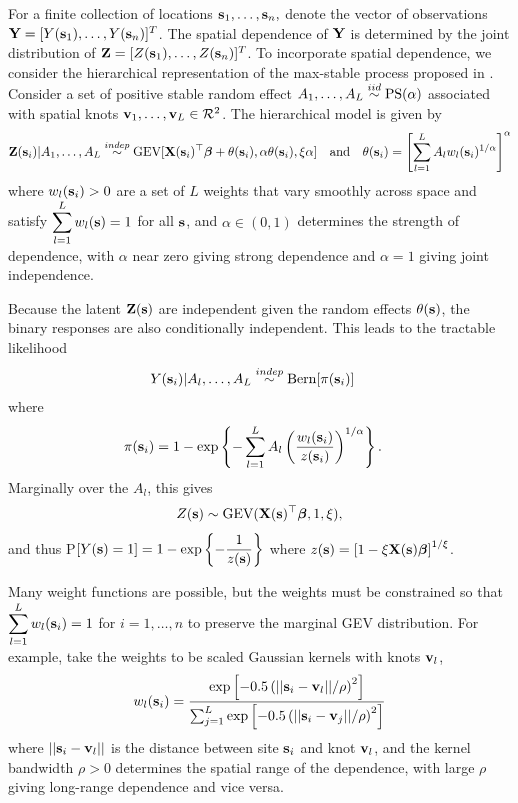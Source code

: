 \documentclass[11pt]{article}
\begin{document}
For a finite collection of locations $\mbox{\bf s}_1, \ldots, \mbox{\bf s}_n,$ denote the vector of observations $\mbox{\bf Y} = [Y(\mbox{\bf s}_1), \ldots, Y(\mbox{\bf s}_n)]^T$.
The spatial dependence of $\mbox{\bf Y}$ is determined by the joint distribution of $\mbox{\bf Z} = [Z(\mbox{\bf s}_1),\ldots, Z(\mbox{\bf s}_n)]^T$.
To incorporate spatial dependence, we consider the hierarchical representation of the max-stable process proposed in \citet{Reich2012}.
Consider a set of positive stable random effect $A_1, \ldots, A_L \stackrel{iid}{\sim} \text{PS}(\alpha)$ associated with spatial knots $\mbox{\bf v}_1, \ldots, \mbox{\bf v}_L \in {\cal R}^2$.
The hierarchical model is given by
\begin{align} \label{rbeq:hiermodel}
  \mbox{\bf Z}(\mbox{\bf s}_i) | A_1, \ldots, A_L \stackrel{indep}{\sim} \text{GEV}[\mbox{\bf X}(\mbox{\bf s}_i)^\top \mbox{\boldmath $\beta$} + \theta(\mbox{\bf s}_i), \alpha \theta(\mbox{\bf s}_i), \xi \alpha] \quad \text{and} \quad \theta(\mbox{\bf s}_i) = \left[\sum_{l = 1}^L A_l w_l (\mbox{\bf s}_i)^{1 / \alpha} \right]^\alpha
\end{align}
where $w_{l}(\mbox{\bf s}_i) > 0$ are a set of $L$ weights that vary smoothly across space and satisfy $\displaystyle \sum_{l = 1}^L w_l(\mbox{\bf s}) = 1$ for all $\mbox{\bf s}$, and $\alpha\in(0,1)$ determines the strength of dependence, with $\alpha$ near zero giving strong dependence and $\alpha=1$ giving joint independence.

Because the latent $\mbox{\bf Z}(\mbox{\bf s})$ are independent given the random effects $\theta(\mbox{\bf s})$, the binary responses are also conditionally independent.
This leads to the tractable likelihood
\begin{align} \label{rbeq:condlike}
  Y(\mbox{\bf s}_i) | A_l, \ldots, A_L &\stackrel{indep}{\sim} \text{Bern}[\pi(\mbox{\bf s}_i)]
\end{align}
where
\begin{align} \label{rbeq:pyeq1cond}
  \pi(\mbox{\bf s}_i) &= 1 - \exp \left\{ -\displaystyle \sum_{ l = 1 }^{L} A_l \left( \frac{ w_{l}(\mbox{\bf s}_i) }{ z(\mbox{\bf s}_i) } \right)^{ 1/\alpha} \right\}.
\end{align}
Marginally over the $A_l$, this gives
\begin{align}
  Z(\mbox{\bf s}) \sim \text{GEV}(\mbox{\bf X}(\mbox{\bf s})^\top \mbox{\boldmath $\beta$}, 1, \xi),
\end{align}
and thus P$[Y(\mbox{\bf s}) = 1] = 1 - \exp\left\{-\displaystyle \frac{1}{z(\mbox{\bf s})}\right\}$ where $z(\mbox{\bf s}) = \left[1 - \xi \mbox{\bf X}(\mbox{\bf s}) \mbox{\boldmath $\beta$}\right]^{1 / \xi}$.

Many weight functions are possible, but the weights must be constrained so that $\displaystyle \sum_{l=1}^L w_{l}(\mbox{\bf s}_i)=1$ for $i=1,\ldots,n$ to preserve the marginal GEV distribution.
For example, \cite{Reich2012} take the weights to be scaled Gaussian kernels with knots $\mbox{\bf v}_l$,
\begin{align}\label{rbeq:w}
   w_{l}(\mbox{\bf s}_i) = \frac{\exp\left[-0.5\left(||\mbox{\bf s}_i-\mbox{\bf v}_l||/\rho\right)^2\right]}
                 {\sum_{j=1}^L\exp\left[-0.5\left(||\mbox{\bf s}_i-\mbox{\bf v}_j||/\rho\right)^2\right]}
\end{align}
where $||\mbox{\bf s}_i - \mbox{\bf v}_l||$ is the distance between site $\mbox{\bf s}_i$ and knot $\mbox{\bf v}_l$, and the kernel bandwidth $\rho>0$ determines the spatial range of the dependence, with large $\rho$ giving long-range dependence and vice versa.
\end{document}

